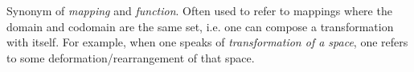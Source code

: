 \documentclass{article}
\begin{document}
Synonym of {\em mapping} and {\em function}.  Often used to refer to mappings where the domain and 
codomain are the same set, i.e. one can compose a transformation with itself.  For example, when one 
speaks of {\em transformation of a space}, one refers to some deformation/rearrangement of that space.
\end{document}
